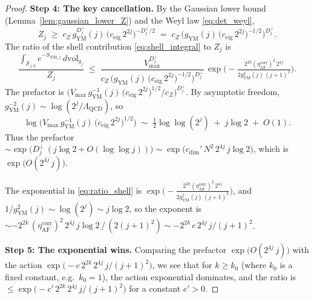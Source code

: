 \begin{proof}
\textbf{Step 4: The key cancellation.} By the Gaussian lower bound
(Lemma~\ref{lem:gaussian_lower_Z}) and the Weyl law
\eqref{eq:det_weyl},
\begin{equation}
\label{eq:Z_lower_weyl}
  Z_{j}\;\ge\;c_{Z}\,g_{\mathrm{YM}}^{D_{j}^{\perp}}(j)\,
  \bigl(c_{\mathrm{eig}}\,2^{2j}\bigr)^{-D_{j}^{\perp}/2}
  \;=\;c_{Z}\,\bigl(g_{\mathrm{YM}}(j)\,
  \bigl(c_{\mathrm{eig}}\,2^{2j}\bigr)^{-1/2}\bigr)^{D_{j}^{\perp}}.
\end{equation}
The ratio of the shell contribution \eqref{eq:shell_integral} to
$Z_{j}$ is
\begin{equation}
\label{eq:ratio_shell}
  \frac{\int_{\mathcal{S}_{j,k}}e^{-S_{\mathrm{YM},j}}\,d\mathrm{
  vol}_{g_{j}}}{Z_{j}}
  \;\le\;\frac{V_{\max}^{D_{j}^{\perp}}}{
  c_{Z}\,\bigl(g_{\mathrm{YM}}(j)\,
  \bigl(c_{\mathrm{eig}}\,2^{2j}\bigr)^{-1/2}\bigr)^{D_{j}^{\perp}}}
  \,\exp\!\bigl(-\tfrac{2^{2k}(\eta_{\mathrm{AF}}^{\mathrm{corr}})^{2}
  \,2^{4j}}{2g_{\mathrm{YM}}^{2}(j)\,(j+1)^{2}}\bigr).
\end{equation}
The prefactor is $\bigl(V_{\max}\,g_{\mathrm{YM}}^{-1}(j)\,
\bigl(c_{\mathrm{eig}}\,2^{2j}\bigr)^{1/2}/c_{Z}\bigr)^{D_{j}^{
\perp}}$. By asymptotic freedom, $g_{\mathrm{YM}}^{-2}(j)\sim
\log(2^{j}/\Lambda_{\mathrm{QCD}})$, so
\begin{equation}
\label{eq:prefactor}
  \log\!\bigl(V_{\max}\,g_{\mathrm{YM}}^{-1}(j)\,
  \bigl(c_{\mathrm{eig}}\,2^{2j}\bigr)^{1/2}\bigr)
  \;\sim\;\tfrac{1}{2}\log\log(2^{j})\;+\;j\log 2\;+\;O(1).
\end{equation}
Thus the prefactor $\sim\exp\!\bigl(D_{j}^{\perp}\,(j\log 2+O(\log
\log j))\bigr)\sim\exp\!\bigl(c_{\dim}'\,N^{2}\,2^{4j}\,j\log 2
\bigr)$, which is $\exp\!\bigl(O(2^{4j}\,j)\bigr)$.

The exponential in \eqref{eq:ratio_shell} is
$\exp\!\bigl(-\tfrac{2^{2k}(\eta_{\mathrm{AF}}^{\mathrm{corr}})^{2}
\,2^{4j}}{2g_{\mathrm{YM}}^{2}(j)\,(j+1)^{2}}\bigr)$, and
$1/g_{\mathrm{YM}}^{2}(j)\sim\log(2^{j})\sim j\log 2$, so the
exponent is $\sim-2^{2k}\,(\eta_{\mathrm{AF}}^{\mathrm{corr}})^{2}\,
2^{4j}\,j\log 2\,/\,(2(j+1)^{2})\sim-2^{2k}\,c\,2^{4j}\,j/(j+1)^{2}$.

\textbf{Step 5: The exponential wins.} Comparing the prefactor
$\exp\!\bigl(O(2^{4j}\,j)\bigr)$ with the action
$\exp\!\bigl(-c\,2^{2k}\,2^{4j}\,j/(j+1)^{2}\bigr)$, we see that for
$k\ge k_{0}$ (where $k_{0}$ is a fixed constant, e.g.\ $k_{0}=1$),
the action exponential dominates, and the ratio is
$\le\exp\!\bigl(-c'\,2^{2k}\,2^{4j}\,j/(j+1)^{2}\bigr)$ for a
constant $c'>0$.


\end{proof}
